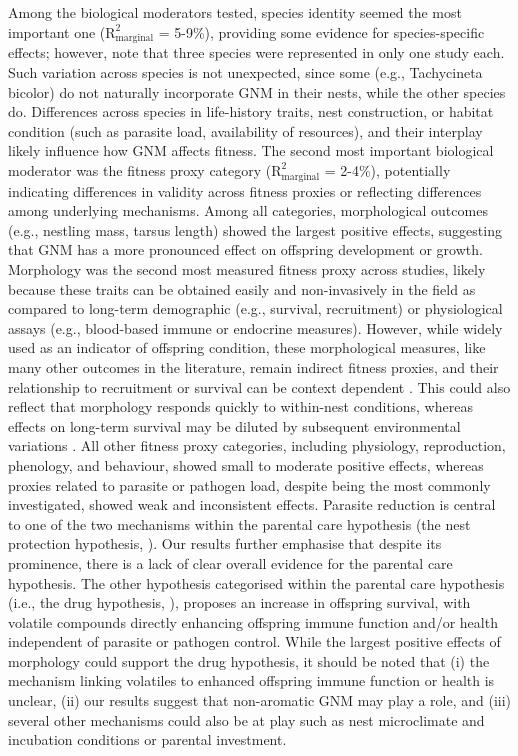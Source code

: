 \documentclass[
  number,
  review,
  onecolumn]{elsarticle}
\begin{document}
Among the biological moderators tested, species identity seemed the most
important one (\(\mathrm{R}^2_{\mathrm{marginal}}\) = 5-9\%), providing
some evidence for species-specific effects; however, note that three
species were represented in only one study each. Such variation across
species is not unexpected, since some (e.g., Tachycineta bicolor) do not
naturally incorporate GNM in their nests, while the other species do.
Differences across species in life-history traits, nest construction, or
habitat condition (such as parasite load, availability of resources),
and their interplay likely influence how GNM affects fitness. The second
most important biological moderator was the fitness proxy category
(\(\mathrm{R}^2_{\mathrm{marginal}}\) = 2-4\%), potentially indicating
differences in validity across fitness proxies or reflecting differences
among underlying mechanisms. Among all categories, morphological
outcomes (e.g., nestling mass, tarsus length) showed the largest
positive effects, suggesting that GNM has a more pronounced effect on
offspring development or growth. Morphology was the second most measured
fitness proxy across studies, likely because these traits can be
obtained easily and non-invasively in the field as compared to long-term
demographic (e.g., survival, recruitment) or physiological assays (e.g.,
blood-based immune or endocrine measures). However, while widely used as
an indicator of offspring condition, these morphological measures, like
many other outcomes in the literature, remain indirect fitness proxies,
and their relationship to recruitment or survival can be context
dependent \citep{labocha2011}. This could also reflect that morphology
responds quickly to within-nest conditions, whereas effects on long-term
survival may be diluted by subsequent environmental variations
\citep{pires2020}. All other fitness proxy categories, including
physiology, reproduction, phenology, and behaviour, showed small to
moderate positive effects, whereas proxies related to parasite or
pathogen load, despite being the most commonly investigated, showed weak
and inconsistent effects. Parasite reduction is central to one of the
two mechanisms within the parental care hypothesis (the nest protection
hypothesis, \citep{wimberger1984, clark1985}). Our results further
emphasise that despite its prominence, there is a lack of clear overall
evidence for the parental care hypothesis. The other hypothesis
categorised within the parental care hypothesis (i.e., the drug
hypothesis, \citep{gwinner2000, mennerat2009}), proposes an increase in
offspring survival, with volatile compounds directly enhancing offspring
immune function and/or health independent of parasite or pathogen
control. While the largest positive effects of morphology could support
the drug hypothesis, it should be noted that (i) the mechanism linking
volatiles to enhanced offspring immune function or health is unclear,
(ii) our results suggest that non-aromatic GNM may play a role, and
(iii) several other mechanisms could also be at play such as nest
microclimate and incubation conditions \citep{corregidor-castro2021} or
parental investment.
\end{document}
